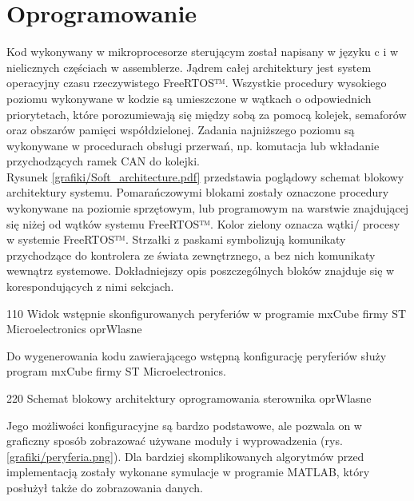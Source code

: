 \section{Oprogramowanie}
\label{s:oprogramowanie}

Kod wykonywany w mikroprocesorze sterującym został napisany w języku c i w nielicznych częściach w assemblerze. Jądrem całej architektury jest system operacyjny czasu rzeczywistego FreeRTOS™. Wszystkie procedury wysokiego poziomu wykonywane w kodzie są umieszczone w wątkach o odpowiednich priorytetach, które porozumiewają się między sobą za pomocą kolejek, semaforów oraz obszarów pamięci współdzielonej. Zadania najniższego poziomu są wykonywane w procedurach obsługi przerwań, np. komutacja lub wkładanie przychodzących ramek CAN do kolejki. \\

Rysunek \ref{grafiki/Soft_architecture.pdf} przedstawia poglądowy schemat blokowy architektury systemu. Pomarańczowymi blokami zostały oznaczone procedury wykonywane na poziomie sprzętowym, lub programowym na warstwie znajdującej się niżej od wątków systemu FreeRTOS™. Kolor zielony oznacza wątki/ procesy w systemie FreeRTOS™. Strzałki z paskami symbolizują komunikaty przychodzące do kontrolera ze świata zewnętrznego, a bez nich komunikaty wewnątrz systemowe. Dokładniejszy opis poszczególnych bloków znajduje się w korespondujących z nimi sekcjach.

	{110}
	{Widok wstępnie skonfigurowanych peryferiów w programie mxCube firmy ST Microelectronics}
	{oprWlasne}
	
Do wygenerowania kodu zawierającego wstępną konfigurację peryferiów służy program mxCube firmy ST Microelectronics.
	
	{220}
	{Schemat blokowy architektury oprogramowania sterownika}
	{oprWlasne}
	
\clearpage

Jego możliwości konfiguracyjne są bardzo podstawowe, ale pozwala on w graficzny sposób zobrazować używane moduły i wyprowadzenia (rys. \ref{grafiki/peryferia.png}). Dla bardziej skomplikowanych algorytmów przed implementacją zostały wykonane symulacje w programie MATLAB, który posłużył także do zobrazowania danych.




















\clearpage